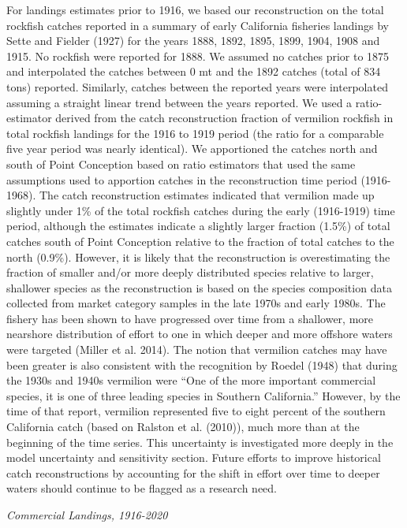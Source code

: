 \documentclass[
  english,
  a4paper,
]{article}
\begin{document}
For landings estimates prior to 1916, we based our reconstruction on the total
rockfish catches reported in a summary of early California fisheries landings by
Sette and Fielder (1927) for the years 1888, 1892, 1895, 1899, 1904, 1908
and 1915. No rockfish were reported for 1888. We assumed no catches prior to 1875
and interpolated the catches between 0 mt and the 1892 catches (total of 834
tons) reported. Similarly, catches between the reported years were interpolated
assuming a straight linear trend between the years reported. We used a
ratio-estimator derived from the catch reconstruction fraction of vermilion
rockfish in total rockfish landings for the 1916 to 1919 period (the ratio for
a comparable five year period was nearly identical). We apportioned the catches
north and south of Point Conception based on ratio estimators that used the same
assumptions used to apportion catches in the reconstruction time period (1916-1968).
The catch reconstruction estimates indicated that vermilion made up slightly under
1\% of the total rockfish catches during the early (1916-1919) time period, although
the estimates indicate a slightly larger fraction (1.5\%) of total catches south of
Point Conception relative to the fraction of total catches to the north (0.9\%). However,
it is likely that the reconstruction is overestimating the fraction of smaller and/or
more deeply distributed species relative to larger, shallower species as the
reconstruction is based on the species composition data collected from market
category samples in the late 1970s and early 1980s. The fishery has been shown
to have progressed over time from a shallower, more nearshore distribution of
effort to one in which deeper and more offshore waters were targeted (Miller et al. 2014).
The notion that vermilion catches may have been greater is also consistent with
the recognition by Roedel (1948) that during the 1930s and 1940s vermilion
were ``One of the more important commercial species, it is one of three leading
species in Southern California.'' However, by the time of that report, vermilion
represented five to eight percent of the southern California catch (based on
Ralston et al. (2010)), much more than at the beginning of the time
series. This uncertainty is investigated more deeply in the model uncertainty and sensitivity section. Future efforts to improve historical catch reconstructions by accounting
for the shift in effort over time to deeper waters should continue to be flagged
as a research need.

\emph{Commercial Landings, 1916-2020}
\end{document}
